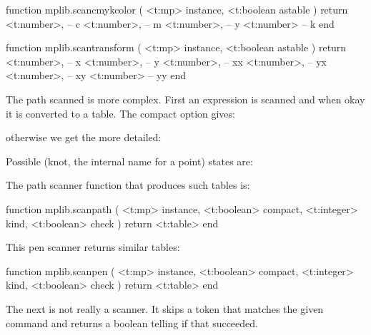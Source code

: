 \starttyping[option=LUA]
function mplib.scancmykcolor ( <t:mp> instance, <t:boolean astable )
    return
        <t:number>, -- c
        <t:number>, -- m
        <t:number>, -- y
        <t:number>  -- k
end
\stoptyping

\starttyping[option=LUA]
function mplib.scantransform ( <t:mp> instance, <t:boolean astable )
    return
        <t:number>, -- x
        <t:number>, -- y
        <t:number>, -- xx
        <t:number>, -- yx
        <t:number>, -- xy
        <t:number>  -- yy
end
\stoptyping

The path scanned is more complex. First an expression is scanned and when okay
it is converted to a table. The compact option gives:

\stoptyping

otherwise we get the more detailed:

\stoptyping

Possible (knot, the internal name for a point) states are:

\startfourrows
{}
\stopfourrows

The path scanner function that produces such tables is:

\starttyping[option=LUA]
function mplib.scanpath (
    <t:mp>      instance,
    <t:boolean> compact,
    <t:integer> kind,
    <t:boolean> check
)
    return <t:table>
end
\stoptyping

This pen scanner returns similar tables:

\starttyping[option=LUA]
function mplib.scanpen (
    <t:mp>      instance,
    <t:boolean> compact,
    <t:integer> kind,
    <t:boolean> check
)
    return <t:table>
end
\stoptyping

The next is not really a scanner. It skips a token that matches the given command
and returns a boolean telling if that succeeded.


